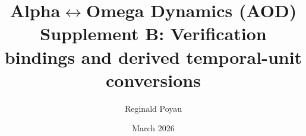 \title{Alpha$\leftrightarrow$Omega Dynamics (AOD)\\
\large Supplement B: Verification bindings and derived temporal-unit conversions}
\author{Reginald Poyau}
\date{March 2026}
\maketitle
